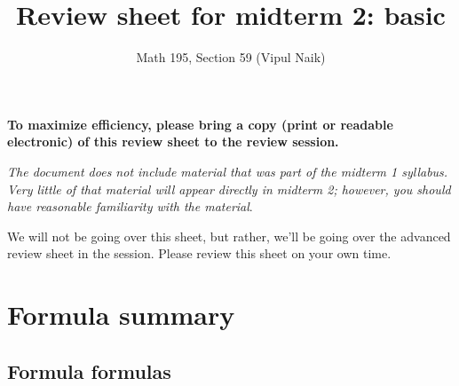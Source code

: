 \documentclass[10pt]{amsart}
\title{Review sheet for midterm 2: basic}
\author{Math 195, Section 59 (Vipul Naik)}
\begin{document}
\maketitle

{\bf To maximize efficiency, please bring a copy (print or readable
electronic) of this review sheet to the review session.}

{\em The document does not include material that was part of the
midterm 1 syllabus. Very little of that material will appear directly
in midterm 2; however, you should have reasonable familiarity with the
material}.

We will not be going over this sheet, but rather, we'll be going over
the advanced review sheet in the session. Please review this sheet on your own time.
\section{Formula summary}

\subsection{Formula formulas}
\end{document}
